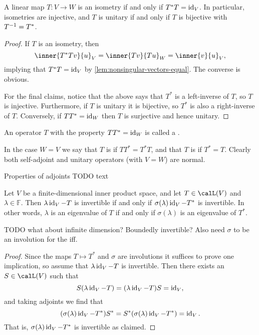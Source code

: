 \begin{lemma}
    A linear map $T \colon V \to W$ is an isometry if and only if $T^*T = \operatorname{id}_V$. In particular, isometries are injective, and $T$ is unitary if and only if $T$ is bijective with $T^{-1} = T^*$.
\end{lemma}

\begin{proof}
    If $T$ is an isometry, then
    \begin{equation*}
        \inner{T^*Tv}{u}_V
            = \inner{Tv}{Tu}_W
            = \inner{v}{u}_V,
    \end{equation*}
    implying that $T^*T = \operatorname{id}_V$ by \cref{lem:nonsingular-vectors-equal}. The converse is obvious.

    For the final claims, notice that the above says that $T^*$ is a left-inverse of $T$, so $T$ is injective. Furthermore, if $T$ is unitary it is bijective, so $T^*$ is also a right-inverse of $T$. Conversely, if $TT^* = \operatorname{id}_W$ then $T$ is surjective and hence unitary.
\end{proof}
%
An operator $T$ with the property $TT^* = \operatorname{id}_W$ is called a .

In the case $W = V$ we say that $T$ is  if $TT^* = T^*T$, and that $T$ is  if $T^* = T$. Clearly both self-adjoint and unitary operators (with $V = W$) are normal.


Properties of adjoints TODO text

\begin{proposition} 
    Let $V$ be a finite-dimensional inner product space, and let $T \in \lin(V)$ and $\lambda \in \mathbb{F}$. Then $\lambda \operatorname{id}_V - T$ is invertible if and only if $\sigma(\lambda) \operatorname{id}_V - T^*$ is invertible. In other words, $\lambda$ is an eigenvalue of $T$ if and only if $\sigma(\lambda)$ is an eigenvalue of $T^*$.
\end{proposition}

TODO what about infinite dimension? Boundedly invertible? Also need $\sigma$ to be an involution for the iff.

\begin{proof}
    Since the maps $T \mapsto T^*$ and $\sigma$ are involutions it suffices to prove one implication, so assume that $\lambda \operatorname{id}_V - T$ is invertible. Then there exists an $S \in \lin(V)$ such that
    \begin{equation*}
        S(\lambda \operatorname{id}_V - T)
            = (\lambda \operatorname{id}_V - T)S
            = \operatorname{id}_V,
    \end{equation*}
    and taking adjoints we find that
    \begin{equation*}
        (\sigma(\lambda) \operatorname{id}_V - T^*)S^*
            = S^*(\sigma(\lambda) \operatorname{id}_V - T^*)
            = \operatorname{id}_V.
    \end{equation*}
    That is, $\sigma(\lambda) \operatorname{id}_V - T^*$ is invertible as claimed.
\end{proof}

